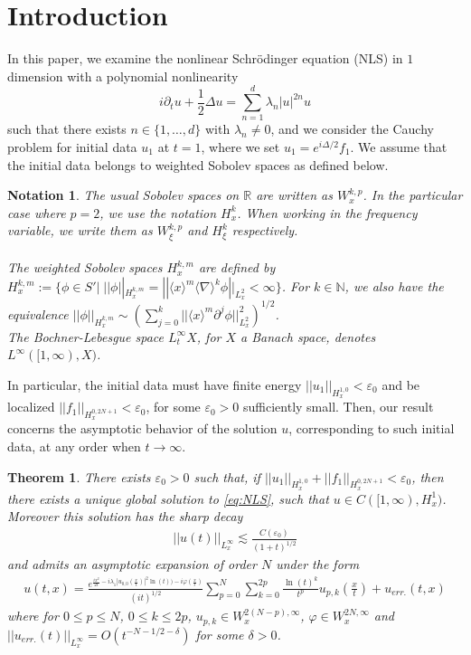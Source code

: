 \documentclass[a4paper, 15pt]{article}
\numberwithin{equation}{section}
\newtheorem{unTheorem}{Theorem}[section]
\newtheorem{nota}[defi]{Notation}
\begin{document}
\section{Introduction} 
In this paper, we examine the nonlinear Schrödinger equation (NLS) in $1$ dimension with a polynomial nonlinearity
\begin{equation}
\label{eq:NLS}
    i\partial_tu+\frac{1}{2}\Delta u=\sum_{n=1}^{d}\lambda_n|u|^{2n}u
\end{equation}
such that there exists $n\in\{1,\dots,d\}$ with $\lambda_n\neq0$,
and we consider the Cauchy problem for initial data $u_1$ at $t=1$, where we set 
$u_1=e^{i\Delta/2}f_1$. We assume that the initial data belongs to weighted Sobolev spaces as defined below.\\
\begin{nota}
The usual Sobolev spaces on $\mathbb{R}$ are written as $W^{k,p}_x$. In the particular case where $p=2$, we use the notation $H^k_x$. When working in the frequency variable, we write them as $W^{k,p}_\xi$ and $H^{k}_\xi$ respectively.\\\\
The weighted Sobolev spaces $H^{k,m}_x$ are defined by $H^{k,m}_x:=\{\phi\in S'|\;||\phi||_{H^{k,m}_x}=||\langle x\rangle^m\langle\nabla\rangle^k\phi||_{L^2_x}<\infty\}$. For $k\in\mathbb{N}$, we also have the equivalence $||\phi||_{H^{k,m}_x}\sim\left(\sum_{j=0}^{k}||\langle x\rangle^m\partial^j\phi||^2_{L^2_x}\right)^{1/2}$.\\
The Bochner-Lebesgue space $L^\infty_tX$, for $X$ a Banach space, denotes $L^\infty([1,\infty),X)$.
\end{nota}
In particular, the initial data must have finite energy $||u_1||_{H^{1,0}_x}< \varepsilon_0$ and be localized $||f_1||_{H^{0,2N+1}_x}<\varepsilon_0$, for some $\varepsilon_0>0$ sufficiently small. Then, our result concerns the asymptotic behavior of the solution $u$, corresponding to such initial data, at any order when $t\to\infty$. \\
\begin{unTheorem}
\label{unTheorem:mainTH}
There exists $\varepsilon_0>0$ such that, if $||u_1||_{H^{1,0}_x}+||f_1||_{H^{0,2N+1}_x}<\varepsilon_0$, then there exists a unique global solution to \eqref{eq:NLS}, such that $u\in C([1,\infty),H^1_x)$. Moreover this solution has the sharp decay 
\begin{align}
||u(t)||_{L^\infty_x}\lesssim \frac{C(\varepsilon_0)}{(1+t)^{1/2}}
\end{align}
and admits an asymptotic expansion of order $N$ under the form
\begin{align}
u(t,x)=\frac{e^{\frac{ix^2}{2t}-i\lambda_1|u_{0,0}\left(\frac{x}{t}\right)|^2\ln(t))-i\varphi(\frac{x}{
t})}}{(it)^{1/2}}\sum_{p=0}^N\sum^{2p}_{k=0}\frac{\ln(t)^k}{t^p}u_{p,k}\left(\frac{x}{t}\right)+u_{err.}(t,x)
\end{align}
where for $0\leq p\leq N$, $0\leq k\leq 2p$, $u_{p,k}\in W^{2(N-p),\infty}_x$, $\varphi\in  W^{2N,\infty}_x$ and $||u_{err.}(t)||_{L^\infty_x}=O(t^{-N-1/2-\delta})$ for some $\delta>0$.
\end{unTheorem}
\end{document}
